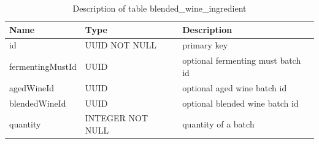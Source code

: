 \begin{table}[th]
	\centering
	\caption{Description of table blended\_wine\_ingredient}
	\label{tab:last_table_describtion}
	\begin{tabular}{|m{}|m{}|m{}|}
		\hline
		Name & Type & Description \\ \hline
		id & UUID NOT NULL & primary key\\ \hline
		fermentingMustId & UUID & optional fermenting must batch id\\ \hline
		agedWineId & UUID & optional aged wine batch id\\ \hline
		blendedWineId & UUID & optional blended wine batch id\\ \hline
		quantity & INTEGER NOT NULL & quantity of a batch\\ \hline
	\end{tabular}
\end{table}

